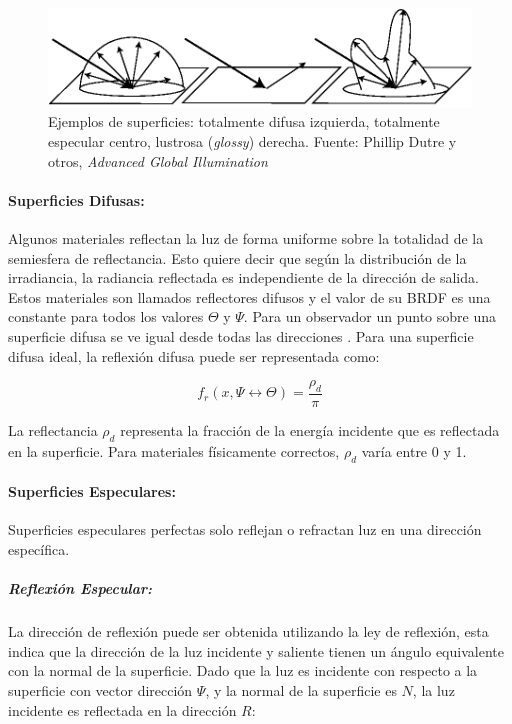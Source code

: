 \begin{figure}[H]
	\centering
	\includegraphics[width=0.85\linewidth]{media/brdfs_types.eps}
	\caption{Ejemplos de superficies: totalmente difusa izquierda, totalmente especular centro, lustrosa (\emph{glossy}) derecha. Fuente: Phillip Dutre y otros, \emph{Advanced Global Illumination} \cite{advanced_gi2006}}
	\label{fig:brdf_types}
\end{figure}

\paragraph{Superficies Difusas:}
Algunos materiales reflectan la luz de forma uniforme sobre la totalidad de la semiesfera de reflectancia. Esto quiere decir que según la distribución de la irradiancia, la radiancia reflectada es independiente de la dirección de salida. Estos materiales son llamados reflectores difusos y el valor de su \ac{BRDF} es una constante para todos los valores $\Theta$ y $\Psi$. Para un observador un punto sobre una superficie difusa se ve igual desde todas las direcciones \cite{advanced_gi2006}. Para una superficie difusa ideal, la reflexión difusa puede ser representada como:

\begin{equation}
    f_{r}(x, \Psi\leftrightarrow\Theta) = \frac{\rho_{d}}{\pi}
    \label{eq:diffuse_reflection}
\end{equation}

La reflectancia $\rho_{d}$ representa la fracción de la energía incidente que es reflectada en la superficie. Para materiales físicamente correctos, $\rho_{d}$ varía entre 0 y 1.

\paragraph{Superficies Especulares:}
\label{para:speculars}
Superficies especulares perfectas solo reflejan o refractan luz en una dirección específica.
\subparagraph{Reflexión Especular:}
La dirección de reflexión puede ser obtenida utilizando la ley de reflexión, esta indica que la dirección de la luz incidente y saliente tienen un ángulo equivalente con la normal de la superficie. Dado que la luz es incidente con respecto a la superficie con vector dirección $\Psi$, y la normal de la superficie es $N$, la luz incidente es reflectada en la dirección $R$:

